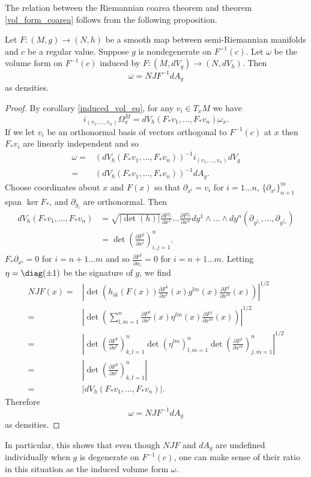 The relation between the Riemannian coarea theorem and theorem \ref{vol_form_coarea} follows from the following proposition.
\begin{proposition}
Let $F:(M,g)\rightarrow (N,h)$  be a smooth map between semi-Riemannian manifolds and $c$ be a regular value.  Suppose $g$ is nondegenerate on $F^{-1}(c)$.  Let $\omega$ be the volume form on $F^{-1}(c)$ induced by $F:(M,dV_g)\rightarrow (N,dV_h)$.  Then
\begin{equation}
\omega=NJF^{-1}dA_g
\end{equation}
as densities.
\end{proposition}
\begin{proof}
By corollary \ref{induced_vol_eq}, for any  $v_i\in T_xM$ we have
\begin{equation}
i_{(v_1,...,v_n)}\Omega^M_x=dV_h(F_*v_1,...,F_*v_n)\omega_x.
\end{equation}
If we let $v_i$ be an orthonormal basis of vectors orthogonal to $F^{-1}(c)$ at $x$ then $F_*v_i$ are linearly independent and so
\begin{align}
\omega=&(dV_h(F_*v_1,...,F_*v_n))^{-1}i_{(v_1,...,v_n)}dV_g\\
=&(dV_h(F_*v_1,...,F_*v_n))^{-1}dA_g.
\end{align}
Choose coordinates about $x$ and $F(x)$ so that $\partial_{x^i}=v_i$ for $i=1...n$, $\{\partial_{x^i}\}_{n+1}^m$ span $\ker F_*$, and $\partial_{y_i}$ are orthonormal.  Then 
\begin{align}
dV_h(F_*v_1,...,F_*v_n)&=\sqrt{|\det(h)|}\frac{\partial F^{j_1}}{\partial x^1}...\frac{\partial F^{j_n}}{\partial x^n}dy^1\wedge...\wedge dy^n(\partial_{y^{j_1}},...,\partial_{y^{j_n}})\\
&=\det\left(\frac{\partial F^{j}}{\partial x^i}\right)_{i,j=1}^n.
\end{align}
$F_*\partial_{x^i}=0$ for $i=n+1...m$ and so $\frac{\partial F^j}{\partial x_i}=0$ for $i=n+1...m$.  Letting $\eta=\diag(\pm 1)$ be the signature of $g$, we find
\begin{align}
NJF(x)=&\left|\det\left(h_{ik}(F(x))\frac{\partial F^k}{\partial x^l}(x)g^{lm}(x)\frac{\partial F^j}{\partial x^m}(x)\right)\right|^{1/2}\\
=&\left|\det\left(\sum_{l,m=1}^n\frac{\partial F^k}{\partial x^l}(x)\eta^{lm}(x)\frac{\partial F^j}{\partial x^m}(x)\right)\right|^{1/2}\\
=&\left|\det\left(\frac{\partial F^k}{\partial x^l}\right)_{k,l=1}^n\det(\eta^{lm})_{l,m=1}^n\det\left(\frac{\partial F^j}{\partial x^m}\right)_{j,m=1}^n\right|^{1/2}\\
=&\left|\det\left(\frac{\partial F^k}{\partial x^l}\right)_{k,l=1}^n\right|\\
=&|dV_h(F_*v_1,...,F_*v_n)|.
\end{align}
Therefore 
\begin{equation}
\omega=NJF^{-1}dA_g
\end{equation}
as densities.
\end{proof}
In particular, this shows that even though $NJF$ and $dA_g$ are undefined individually when $g$ is degenerate on $F^{-1}(c)$, one can make sense of their ratio in this situation as the induced volume form $\omega$.


